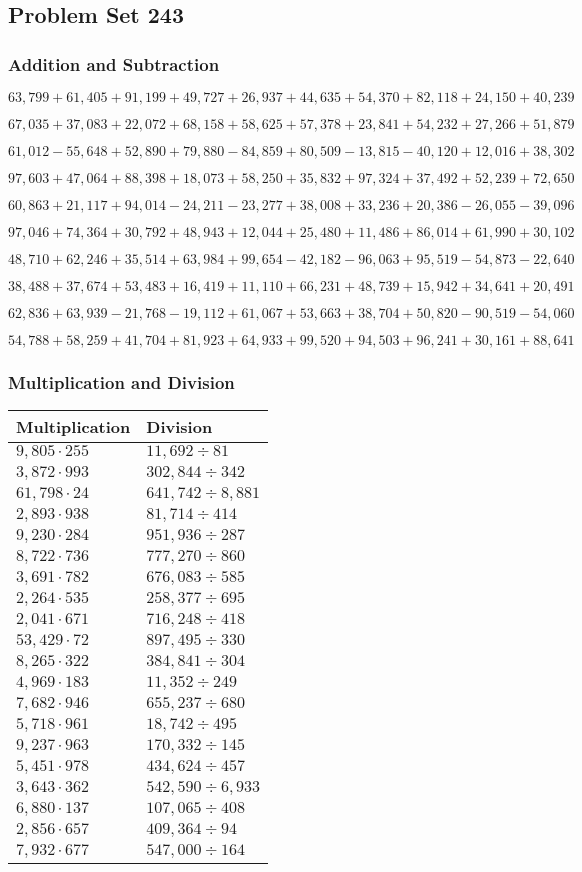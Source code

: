 \hypertarget{problem-set-243}{%
\subsection{Problem Set 243}\label{problem-set-243}}

\hypertarget{addition-and-subtraction}{%
\subsubsection{Addition and
Subtraction}\label{addition-and-subtraction}}

\(63,799+61,405+91,199+49,727+26,937+44,635+54,370+82,118+24,150+40,239\)

\(67,035+37,083+22,072+68,158+58,625+57,378+23,841+54,232+27,266+51,879\)

\(61,012-55,648+52,890+79,880-84,859+80,509-13,815-40,120+12,016+38,302\)

\(97,603+47,064+88,398+18,073+58,250+35,832+97,324+37,492+52,239+72,650\)

\(60,863+21,117+94,014-24,211-23,277+38,008+33,236+20,386-26,055-39,096\)

\(97,046+74,364+30,792+48,943+12,044+25,480+11,486+86,014+61,990+30,102\)

\(48,710+62,246+35,514+63,984+99,654-42,182-96,063+95,519-54,873-22,640\)

\(38,488+37,674+53,483+16,419+11,110+66,231+48,739+15,942+34,641+20,491\)

\(62,836+63,939-21,768-19,112+61,067+53,663+38,704+50,820-90,519-54,060\)

\(54,788+58,259+41,704+81,923+64,933+99,520+94,503+96,241+30,161+88,641\)

\hypertarget{multiplication-and-division}{%
\subsubsection{Multiplication and
Division}\label{multiplication-and-division}}

\begin{longtable}[]{@{}ll@{}}
\toprule
Multiplication & Division\tabularnewline
\midrule
\endhead
\(9,805\cdot255\) & \(11,692÷81\)\tabularnewline
\(3,872\cdot993\) & \(302,844÷342\)\tabularnewline
\(61,798\cdot24\) & \(641,742÷8,881\)\tabularnewline
\(2,893\cdot938\) & \(81,714÷414\)\tabularnewline
\(9,230\cdot284\) & \(951,936÷287\)\tabularnewline
\(8,722\cdot736\) & \(777,270÷860\)\tabularnewline
\(3,691\cdot782\) & \(676,083÷585\)\tabularnewline
\(2,264\cdot535\) & \(258,377÷695\)\tabularnewline
\(2,041\cdot671\) & \(716,248÷418\)\tabularnewline
\(53,429\cdot72\) & \(897,495÷330\)\tabularnewline
\(8,265\cdot322\) & \(384,841÷304\)\tabularnewline
\(4,969\cdot183\) & \(11,352÷249\)\tabularnewline
\(7,682\cdot946\) & \(655,237÷680\)\tabularnewline
\(5,718\cdot961\) & \(18,742÷495\)\tabularnewline
\(9,237\cdot963\) & \(170,332÷145\)\tabularnewline
\(5,451\cdot978\) & \(434,624÷457\)\tabularnewline
\(3,643\cdot362\) & \(542,590÷6,933\)\tabularnewline
\(6,880\cdot137\) & \(107,065÷408\)\tabularnewline
\(2,856\cdot657\) & \(409,364÷94\)\tabularnewline
\(7,932\cdot677\) & \(547,000÷164\)\tabularnewline
\bottomrule
\end{longtable}
